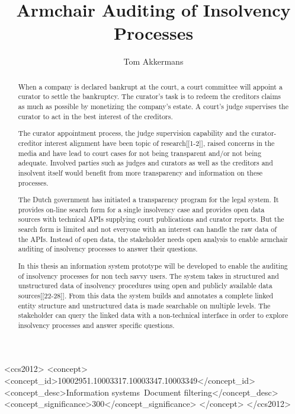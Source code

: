 \documentclass[sigconf]{acmart}
\title{Armchair Auditing of Insolvency Processes}
\author{Tom Akkermans}
\affiliation{\institution{University of Amsterdam}}
\begin{document}


\begin{abstract}
When a company is declared bankrupt at the court, a court committee will appoint a curator to settle the bankruptcy. The curator's task is to redeem the creditors claims as much as possible by monetizing the company's estate. A court's judge supervises the curator to act in the best interest of the creditors.

The curator appointment process, the judge supervision capability and the curator-creditor interest alignment have been topic of research[[1-2]], raised concerns in the media \cite{dennis_meneer_2018:1} and have lead to court cases for not being transparent and/or not being adequate. Involved parties such as judges and curators as well as the creditors and insolvent itself would benefit from more transparency and information on these processes.

The Dutch government has initiated a transparency program for the legal system. It provides on-line search form for a single insolvency case and provides open data sources with technical APIs supplying court publications and curator reports. But the search form is limited and not everyone with an interest can handle the raw data of the APIs. Instead of open data, the stakeholder needs open analysis to enable armchair auditing of insolvency processes to answer their questions.

In this thesis an information system prototype will be developed to enable the auditing of insolvency processes for non tech savvy users. The system takes in structured and unstructured data of insolvency procedures using open and publicly available data sources[[22-28]]. From this data the system builds and annotates a complete linked entity structure and unstructured data is made searchable on multiple levels. The stakeholder can query the linked data with a non-technical interface in order to explore insolvency processes and answer specific questions.
\end{abstract}

%
%
\begin{CCSXML}
<ccs2012>
	<concept>
		<concept_id>10002951.10003317.10003347.10003349</concept_id>
		<concept_desc>Information systems~Document filtering</concept_desc>
		<concept_significance>300</concept_significance>
	</concept>
</ccs2012>
\end{CCSXML}


\maketitle 






\end{document}
